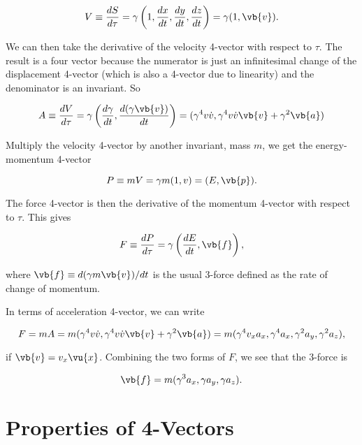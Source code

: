 \documentclass[english,a4paper,12pt]{report}
\begin{document}
\begin{equation}
    V \equiv  \frac{dS}{d\tau } = \gamma \left(1, \frac{dx}{dt}, \frac{dy}{dt}, \frac{dz}{dt}\right) = \gamma (1, \vb{v} ).
\end{equation}

We can then take the derivative of the velocity 4-vector with respect to \(\tau \). The result is a four vector because the numerator is just an infinitesimal change of the displacement 4-vector (which is also a 4-vector due to linearity) and the denominator is an invariant. So

\begin{equation}
    A \equiv  \frac{dV}{d\tau } = \gamma \left(\frac{d\gamma }{dt}, \frac{d(\gamma \vb{v} )}{dt}\right) = (\gamma ^{4}v \dot{v} , \gamma ^{4} v \dot{v} \vb{v} + \gamma ^2 \vb{a})
\end{equation}

Multiply the velocity 4-vector by another invariant, mass \(m\), we get the energy-momentum 4-vector

\begin{equation}
    P \equiv mV = \gamma m(1,v) = (E, \vb{p} ). 
\end{equation}

The force 4-vector is then the derivative of the momentum 4-vector with respect to \(\tau \). This gives

\begin{equation}
    F \equiv \frac{dP}{d\tau } = \gamma \left(\frac{dE}{dt}, \vb{f}\right),
\end{equation}

where \(\vb{f} \equiv d(\gamma m\vb{v} )/dt \) is the usual 3-force defined as the rate of change of momentum.  

In terms of acceleration 4-vector, we can write 

\begin{equation}
    F = mA = m(\gamma ^{4}v \dot{v} , \gamma ^{4} v \dot{v} \vb{v}  + \gamma ^2 \vb{a}  ) = m(\gamma ^{4} v_{x} a_{x}, \gamma ^{4} a_{x}, \gamma ^2 a_{y}, \gamma ^2 a_{z}),
\end{equation}

if \(\vb{v} = v_{x}\vu{x}  \). Combining the two forms of \(F\), we see that the 3-force is

\begin{equation}
    \vb{f} = m(\gamma ^3 a_{x}, \gamma a_{y}, \gamma a_{z}).
\end{equation}

\section{Properties of 4-Vectors}
\end{document}
